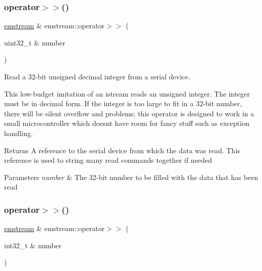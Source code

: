 \subsubsection{\texorpdfstring{operator$>$$>$()}{operator>>()}\hspace{0.1cm}{\footnotesize\ttfamily [6/8]}}
{\footnotesize\ttfamily \mbox{\hyperlink{classemstream}{emstream}} \& emstream\+::operator$>$$>$ (\begin{DoxyParamCaption}\item[{uint32\+\_\+t \&}]{number }\end{DoxyParamCaption})}



Read a 32-\/bit unsigned decimal integer from a serial device. 

This low-\/budget imitation of an {\ttfamily istream} reads an unsigned integer. The integer must be in decimal form. If the integer is too large to fit in a 32-\/bit number, there will be silent overflow and problems; this operator is designed to work in a small microcontroller which doesn\textquotesingle{}t have room for fancy stuff such as exception handling. \begin{DoxyReturn}{Returns}
A reference to the serial device from which the data was read. This reference is used to string many read commands together if needed 
\end{DoxyReturn}

\begin{DoxyParams}{Parameters}
{\em number} & The 32-\/bit number to be filled with the data that has been read \\
\hline
\end{DoxyParams}
\mbox{\label{classemstream_ab4e4c0eda7e6f1aabd6f12de6f66f9af}} 
\subsubsection{\texorpdfstring{operator$>$$>$()}{operator>>()}\hspace{0.1cm}{\footnotesize\ttfamily [7/8]}}
{\footnotesize\ttfamily \mbox{\hyperlink{classemstream}{emstream}} \& emstream\+::operator$>$$>$ (\begin{DoxyParamCaption}\item[{int32\+\_\+t \&}]{number }\end{DoxyParamCaption})}



